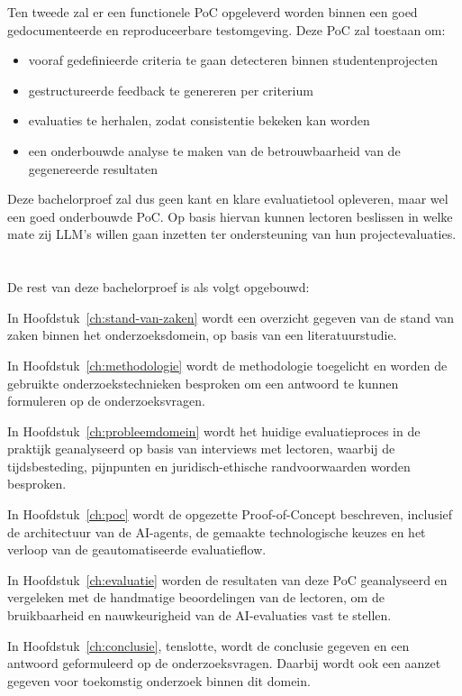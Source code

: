\vspace{1em}

Ten tweede zal er een functionele PoC opgeleverd worden binnen een goed gedocumenteerde en reproduceerbare testomgeving. Deze PoC zal toestaan om:

\begin{itemize}
    \item vooraf gedefinieerde criteria te gaan detecteren binnen studentenprojecten 
    \item gestructureerde feedback te genereren per criterium
    \item evaluaties te herhalen, zodat consistentie bekeken kan worden
    \item een onderbouwde analyse te maken van de betrouwbaarheid van de gegenereerde resultaten
\end{itemize} 

\vspace{1em} 

Deze bachelorproef zal dus geen kant en klare evaluatietool opleveren, maar wel een goed onderbouwde PoC. Op basis hiervan kunnen lectoren beslissen in welke mate zij LLM's willen gaan inzetten ter ondersteuning van hun projectevaluaties.

\section{}%
\label{sec:opzet-bachelorproef}

De rest van deze bachelorproef is als volgt opgebouwd:

In Hoofdstuk~\ref{ch:stand-van-zaken} wordt een overzicht gegeven van de stand van zaken binnen het onderzoeksdomein, op basis van een literatuurstudie.

In Hoofdstuk~\ref{ch:methodologie} wordt de methodologie toegelicht en worden de gebruikte onderzoekstechnieken besproken om een antwoord te kunnen formuleren op de onderzoeksvragen.

In Hoofdstuk~\ref{ch:probleemdomein} wordt het huidige evaluatieproces in de praktijk geanalyseerd op basis van interviews met lectoren, waarbij de tijdsbesteding, pijnpunten en juridisch-ethische randvoorwaarden worden besproken.

In Hoofdstuk~\ref{ch:poc} wordt de opgezette Proof-of-Concept beschreven, inclusief de architectuur van de AI-agents, de gemaakte technologische keuzes en het verloop van de geautomatiseerde evaluatieflow.

In Hoofdstuk~\ref{ch:evaluatie} worden de resultaten van deze PoC geanalyseerd en vergeleken met de handmatige beoordelingen van de lectoren, om de bruikbaarheid en nauwkeurigheid van de AI-evaluaties vast te stellen.

In Hoofdstuk~\ref{ch:conclusie}, tenslotte, wordt de conclusie gegeven en een antwoord geformuleerd op de onderzoeksvragen. Daarbij wordt ook een aanzet gegeven voor toekomstig onderzoek binnen dit domein.
